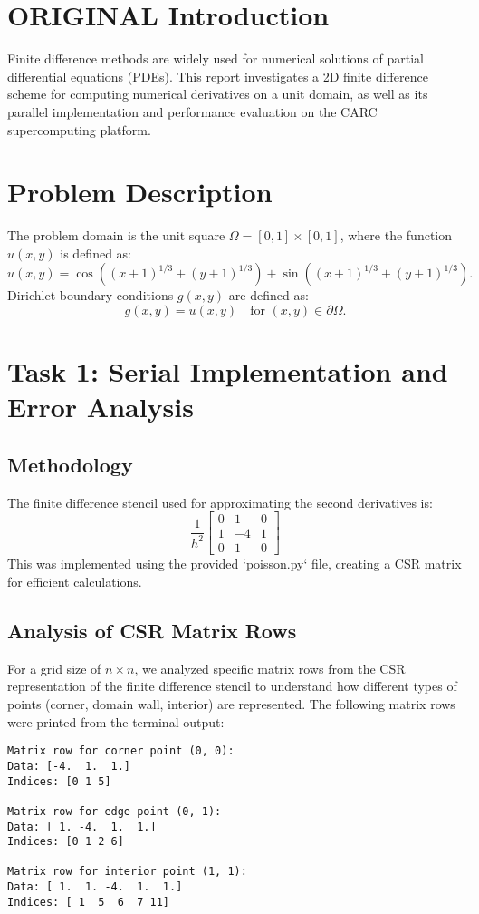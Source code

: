 \documentclass[12pt]{article}
\begin{document}
\section{ORIGINAL Introduction}
Finite difference methods are widely used for numerical solutions of
 partial differential equations (PDEs). This report investigates a 2D 
 finite difference scheme for computing numerical derivatives on a unit 
 domain, as well as its parallel implementation and performance evaluation 
 on the CARC supercomputing platform.

\section{Problem Description}
The problem domain is the unit square \(\Omega = [0, 1] \times [0, 1]\), where the function \(u(x, y)\) is defined as:
\[
u(x, y) = \cos((x+1)^{1/3} + (y+1)^{1/3}) + \sin((x+1)^{1/3} + (y+1)^{1/3}).
\]
Dirichlet boundary conditions \(g(x, y)\) are defined as:
\[
g(x, y) = u(x, y) \quad \text{for } (x, y) \in \partial \Omega.
\]

\section{Task 1: Serial Implementation and Error Analysis}
\subsection{Methodology}
The finite difference stencil used for approximating the second derivatives is:
\[
\frac{1}{h^2} \begin{bmatrix} 0 & 1 & 0 \\ 1 & -4 & 1 \\ 0 & 1 & 0 \end{bmatrix}
\]
This was implemented using the provided `poisson.py` file, creating a CSR matrix for efficient calculations.

\subsection{Analysis of CSR Matrix Rows}
For a grid size of \( n \times n \), we analyzed specific matrix rows from the CSR representation of the finite difference stencil to understand how different types of points (corner, domain wall, interior) are represented. The following matrix rows were printed from the terminal output:

\begin{verbatim}
Matrix row for corner point (0, 0):
Data: [-4.  1.  1.]
Indices: [0 1 5]

Matrix row for edge point (0, 1):
Data: [ 1. -4.  1.  1.]
Indices: [0 1 2 6]

Matrix row for interior point (1, 1):
Data: [ 1.  1. -4.  1.  1.]
Indices: [ 1  5  6  7 11]
\end{verbatim}
\end{document}
